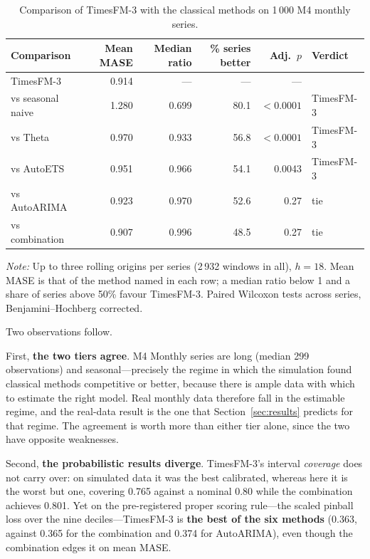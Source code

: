 \documentclass[article]{ajs}
\providecommand{\sectionref}[1]{Section~\ref{#1}}
\begin{document}
\begin{table}[!htbp]
\centering
\begin{threeparttable}
\caption{Comparison of TimesFM-3 with the classical methods on 1\,000 M4 monthly series.}
\label{tab:realdata}
\begin{tabular}{lrrrrl}
\toprule
Comparison & Mean MASE & Median ratio & \% series better & Adj.\ $p$ & Verdict \\
\midrule
TimesFM-3          & 0.914 & ---   & ---  & ---    & \\
\midrule
vs seasonal naive  & 1.280 & 0.699 & 80.1 & $<0.0001$ & TimesFM-3 \\
vs Theta           & 0.970 & 0.933 & 56.8 & $<0.0001$ & TimesFM-3 \\
vs AutoETS         & 0.951 & 0.966 & 54.1 & 0.0043    & TimesFM-3 \\
vs AutoARIMA       & 0.923 & 0.970 & 52.6 & 0.27      & tie \\
vs combination     & 0.907 & 0.996 & 48.5 & 0.27      & tie \\
\bottomrule
\end{tabular}
\begin{tablenotes}[flushleft]\footnotesize
\item \textit{Note:} Up to three rolling origins per series (2\,932 windows in all), $h = 18$.
Mean MASE is that of the method named in each row; a median ratio below 1 and a share of series
above 50\% favour TimesFM-3. Paired Wilcoxon tests across series, Benjamini--Hochberg corrected.
\end{tablenotes}
\end{threeparttable}
\end{table}

Two observations follow.

First, \textbf{the two tiers agree}. M4 Monthly series are long (median 299 observations) and
seasonal---precisely the regime in which the simulation found classical methods competitive or
better, because there is ample data with which to estimate the right model. Real monthly data
therefore fall in the estimable regime, and the real-data result is the one that
\sectionref{sec:results} predicts for that regime. The agreement is worth more than either tier alone, since the two have opposite
weaknesses.

Second, \textbf{the probabilistic results diverge}.
TimesFM-3's interval \emph{coverage} does not carry over: on simulated data it was the best
calibrated, whereas here it is the worst but one, covering 0.765 against a nominal 0.80 while the
combination achieves 0.801. Yet on the pre-registered proper scoring rule---the scaled pinball
loss over the nine deciles---TimesFM-3 is \textbf{the best of the six methods} (0.363, against
0.365 for the combination and 0.374 for AutoARIMA), even though the combination edges it on mean
MASE.
\end{document}
